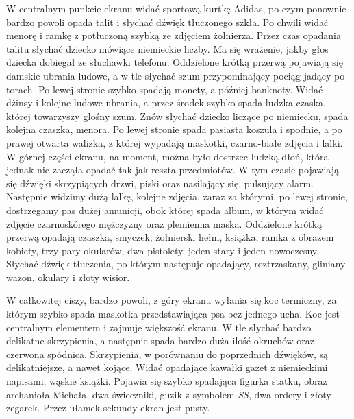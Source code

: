 \documentclass[14pt]{extarticle}
\begin{document}
W centralnym punkcie ekranu widać sportową kurtkę Adidas, po czym ponownie bardzo powoli opada talit i słychać dźwięk tłuczonego szkła. Po chwili widać menorę i ramkę z potłuczoną szybką ze zdjęciem żołnierza. Przez czas opadania talitu słychać dziecko mówiące niemieckie liczby. Ma się wrażenie, jakby głos dziecka dobiegał ze słuchawki telefonu. Oddzielone krótką przerwą pojawiają się damskie ubrania ludowe, a w tle słychać szum przypominający pociąg jadący po torach. Po lewej stronie szybko spadają monety, a później banknoty. Widać dżinsy i kolejne ludowe ubrania, a przez środek szybko spada ludzka czaska, której towarzyszy głośny szum. Znów słychać dziecko liczące po niemiecku, spada kolejna czaszka, menora. Po lewej stronie spada pasiasta koszula i spodnie, a po prawej otwarta walizka, z której wypadają maskotki, czarno-białe zdjęcia i lalki. W górnej części ekranu, na moment, można było dostrzec ludzką dłoń, która jednak nie zacząła opadać tak jak reszta przedmiotów. W tym czasie pojawiają się dźwięki skrzypiących drzwi, piski oraz nasilający się, pulsujący alarm. Następnie widzimy dużą lalkę, kolejne zdjęcia, zaraz za którymi, po lewej stronie, dostrzegamy pas dużej amunicji, obok której spada album, w którym widać zdjęcie czarnoskórego mężczyzny oraz plemienna maska. Oddzielone krótką przerwą opadają czaszka, smyczek, żołnierski hełm, książka, ramka z obrazem kobiety, trzy pary okularów, dwa pistolety, jeden stary i jeden nowoczesny. Słychać dźwięk tłuczenia, po którym następuje opadający, roztrzaskany, gliniany wazon, okulary i złoty wisior. 

W całkowitej ciszy, bardzo powoli, z góry ekranu wyłania się koc termiczny, za którym szybko spada maskotka przedstawiająca psa bez jednego ucha. Koc jest centralnym elementem i zajmuje większość ekranu. W tle słychać bardzo delikatne skrzypienia, a następnie spada bardzo duża ilość okruchów oraz czerwona spódnica. Skrzypienia, w porównaniu do poprzednich dźwięków, są delikatniejsze, a nawet kojące. Widać opadające kawałki gazet z niemieckimi napisami, wąskie książki. Pojawia się szybko spadająca figurka statku, obraz archanioła Michała, dwa świeczniki, guzik z symbolem \textit{SS}, dwa ordery i złoty zegarek. Przez ułamek sekundy ekran jest pusty.
\end{document}
